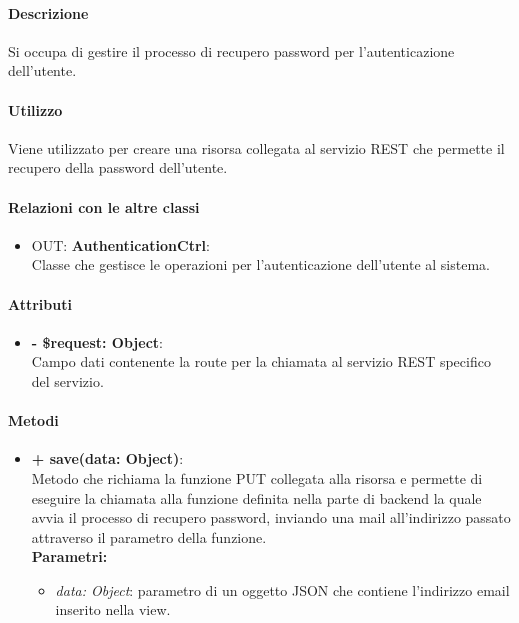 		\paragraph{Descrizione}
		Si occupa di gestire il processo di recupero password per l'autenticazione dell'utente.
		
		\paragraph{Utilizzo}
		Viene utilizzato per creare una risorsa collegata al servizio \gls{REST} che permette il recupero della password dell'utente.
		
		\paragraph{Relazioni con le altre classi}
		\begin{itemize}
			\item OUT: \textbf{AuthenticationCtrl}:\\
			Classe che gestisce le operazioni per l'autenticazione dell'utente al sistema.
		\end{itemize}
		
		\paragraph{Attributi}
		\begin{itemize}
			\item \textbf{- \$request: Object}:\\
			Campo dati contenente la route per la chiamata al servizio \gls{REST} specifico del servizio.
		\end{itemize}	
		
		\paragraph{Metodi}
		\begin{itemize}
			\item \textbf{+ save(data: Object)}:\\
			Metodo che richiama la funzione PUT collegata alla risorsa e permette di eseguire la chiamata alla funzione definita nella parte di backend la quale avvia il processo di recupero password, inviando una mail all'indirizzo passato attraverso il parametro della funzione.\\
			\textbf{Parametri:}\\
			\begin{itemize}
				\item \textit{data: Object}: parametro di un oggetto \gls{JSON} che contiene l'indirizzo email inserito nella view.
			\end{itemize}
		\end{itemize}
\newpage
		

